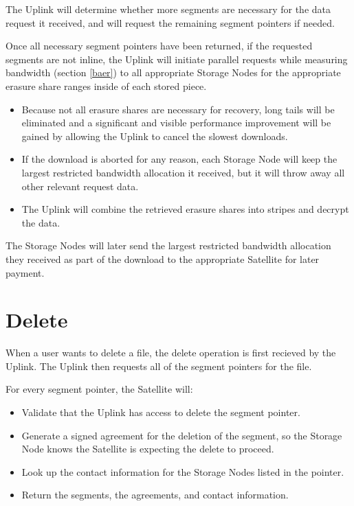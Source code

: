 \documentclass[8pt,fleqn,openany]{book}
\begin{document}
The Uplink will determine whether more segments are necessary for the
  data request it received, and will request the remaining segment pointers if needed.

Once all necessary segment pointers have been returned, if the requested
  segments are not inline, the Uplink will initiate parallel requests
  while measuring bandwidth (section \ref{baer}) to all appropriate Storage
  Nodes for the appropriate erasure share ranges inside of each stored piece.

\begin{itemize}
\item Because not all erasure shares are necessary for recovery, long tails
  will be eliminated and a significant and visible performance improvement will
  be gained by allowing the Uplink to cancel the slowest downloads.
\item If the download is aborted for any reason, each Storage Node will keep the
  largest restricted bandwidth allocation it received, but it will throw away all
  other relevant request data.
\item The Uplink will combine the retrieved erasure shares into stripes and
  decrypt the data.
\end{itemize}

The Storage Nodes will later send the largest restricted
  bandwidth allocation they received as part of the download to the appropriate
  Satellite for later payment.

\section{Delete}

When a user wants to delete a file, the delete operation is first recieved
by the Uplink. The Uplink then requests all of the segment pointers for the file.

For every segment pointer, the Satellite will:
  \begin{itemize}
  \item Validate that the Uplink has access to delete the segment pointer.
  \item Generate a signed agreement for the deletion of the segment, so the
    Storage Node knows the Satellite is expecting the delete to proceed.
  \item Look up the contact information for the Storage Nodes listed in the
  pointer.
  \item Return the segments, the agreements, and contact information.
  \end{itemize}
\end{document}
